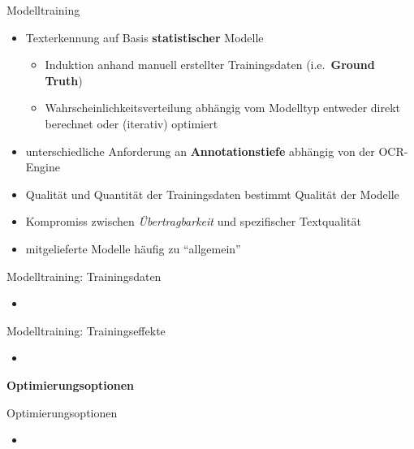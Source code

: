 \documentclass{bbawslides}
\begin{document}
\begin{bbawslide}{Modelltraining}
  \vspace*{7mm}%
  \centerslidestrue%
  \begin{itemize}
    \item Texterkennung auf Basis \textbf{statistischer} Modelle
    \begin{itemize}
      \item Induktion anhand manuell erstellter Trainingsdaten (i.e.~\textbf{Ground Truth})
      \item Wahrscheinlichkeitsverteilung abhängig vom Modelltyp entweder direkt berechnet oder (iterativ) optimiert
    \end{itemize}
    \item unterschiedliche Anforderung an \textbf{Annotationstiefe} abhängig von der OCR-Engine
    \item Qualität und Quantität der Trainingsdaten bestimmt Qualität der Modelle
    \item Kompromiss zwischen \emph{Übertragbarkeit} und spezifischer Textqualität
    \item mitgelieferte Modelle häufig zu \enquote{allgemein}
  \end{itemize}
\end{bbawslide}

\begin{bbawslide}{Modelltraining: Trainingsdaten}
  \vspace*{7mm}%
  \centerslidestrue%
  \begin{itemize}
    \item
  \end{itemize}
\end{bbawslide}

\begin{bbawslide}{Modelltraining: Trainingseffekte}
  \vspace*{7mm}%
  \centerslidestrue%
  \begin{itemize}
    \item
  \end{itemize}
\end{bbawslide}

\begin{bbawpart}{\Large\bf Optimierungsoptionen}
\end{bbawpart}

\begin{bbawslide}{Optimierungsoptionen}
  \vspace*{7mm}%
  \centerslidestrue%
  \begin{itemize}
    \item
  \end{itemize}
\end{bbawslide}
\end{document}
